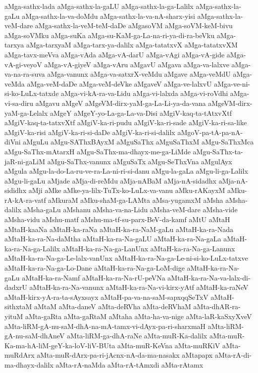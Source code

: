 {aMga-sathx-lada
aMga-sathx-la-gaLU
aMga-sathx-la-ga-Lalilx
aMga-sathx-la-gaLu
aMga-sathx-la-va-doMdu
aMga-sathx-la-va-nA-sharx-yisi
aMga-sathx-la-veM-dare
aMga-sathx-la-veM-teM-daDe
aMgasoVM
aMga-soVM-keM-bivu
aMga-soVMku
aMga-suKa
aMga-su-KaM-ga-La-na-ri-ya-di-ra-beVku
aMga-tarxya
aMga-tarxyaM
aMga-tarx-ya-dalilx
aMga-tatatxvX
aMga-tatatxvXM
aMga-tavx-meVva
aMga-vAda
aMga-vA-darU
aMga-vAgi
aMga-vA-gide
aMga-vA-gi-veyoV
aMga-vA-giyeV
aMga-vAru
aMgavU
aMgava
aMga-va-lalxve
aMga-va-na-ra-suva
aMga-vanunx
aMga-va-satxrX-veMdu
aMgave
aMga-veMdU
aMga-veMda
aMga-veM-daDe
aMga-veM-deVke
aMgaveV
aMga-ve-lalxvU
aMga-ve-ni-si-ko-LuLx-tatxde
aMga-vi-kA-ra-va-Lidu
aMga-vi-lalxda
aMga-vi-roVdhi
aMga-vi-sa-diru
aMgavu
aMgeV
aMgeVM-dirx-yaM-ga-La-Li-ya-da-vana
aMgeVM-dirx-yaM-ga-Lelalx
aMgeY
aMgeY-yo-La-ga-La-va-Disi
aMgiV-kaq-ta-tAtxvXtf
aMgiV-kaq-ta-tatxvXtf
aMgiV-ka-ri-pudu
aMgiV-ka-ri-sade
aMgiV-ka-ri-sa-like
aMgiV-ka-risi
aMgiV-ka-ri-si-daDe
aMgiV-ka-ri-si-dalilx
aMgoV-pa-tA-pa-nA-diVni
aMguLu
aMgu-SAThxBAyxM
aMguSaThx
aMguSaThxM
aMgu-SaThxMca
aMgu-SaThx-mAtarxH
aMgu-SaThx-ma-dhayx-me-ga-LiMde
aMgu-SaThx-ta-jaR-ni-gaLiM
aMgu-SaThx-vanunx
aMguSaTx
aMgu-SeThxVna
aMgulAyx
aMgula
aMgu-la-do-La-ru-ve-ra-La-ni-ri-si-danu
aMgu-la-gaLa
aMgu-li-ga-Lalilx
aMgu-li-gaLu
aMjade
aMja-di-reMdu
aMja-nABaM
aMja-nA-sidadhx
aMja-nA-sididhx
aMji
aMke
aMke-ya-lilx-TuTx-ko-LuLx-va-vanu
aMku-rAKayxM
aMku-rA-kA-ra-vatf
aMkuraM
aMku-shaM-ga-LAMta
aMsa-yugamxM
aMsha
aMsha-dalilx
aMsha-gaLu
aMshanu
aMsha-va-na-Lidu
aMsha-veM-dare
aMsha-vide
aMsha-vidu
aMshu-matf
aMshu-ma-tf-su-parx-BeV-da-kamf
aMtU
aMtaH
aMtaH-kaaNa
aMtaH-ka-raNa
aMtaH-ka-ra-NaM-gaLu
aMtaH-ka-ra-Nada
aMtaH-ka-ra-Na-daMtha
aMtaH-ka-ra-Na-gaLU
aMtaH-ka-ra-Na-gaLa
aMtaH-ka-ra-Na-ga-Lalilx
aMtaH-ka-ra-Na-ga-LanUnx
aMtaH-ka-ra-Na-ga-Lanunx
aMtaH-ka-ra-Na-ga-Le-lalx-vanUnx
aMtaH-ka-ra-Na-ga-Le-ni-si-ko-LuLx-tatxve
aMtaH-ka-ra-Na-ga-Lo-Dane
aMtaH-ka-ra-Na-ga-LoM-dige
aMtaH-ka-ra-Na-gaLu
aMtaH-ka-ra-Namf
aMtaH-ka-ra-Na-rU-peVNa
aMtaH-ka-ra-Na-va-lalx-di-dadxrU
aMtaH-ka-ra-Na-vanunx
aMtaH-ka-ra-Na-vi-kirx-yAtf
aMtaH-ka-raNeV
aMtaH-kirx-yA-ra-ta-sAyxsayx
aMtaH-pa-va-na-saM-sapxqqSeTxV
aMtaH-sithxtaM
aMtaM
aMta-daneV
aMta-deRVha
aMta-deRVhaM
aMta-dhAR-ra-yituM
aMta-gaRta
aMta-gaRtaM
aMtaha
aMta-ha-va-nige
aMta-laR-kaSxyXveV
aMta-liRM-gA-nu-saM-dhA-na-mA-tamx-vi-dAyx-pa-ri-sharxmaH
aMta-liRM-gA-nu-saM-dhAneV
aMta-liRM-ga-dhA-raNe
aMta-muR-Ka-dalilx
aMta-muR-Ka-ma-hA-liM-geY-ka-loV-liV-BUta
aMta-muR-KeVna
aMta-muRKiV
aMta-muRdArx
aMta-muR-dArx-pa-ri-jAcnx-nA-da-ma-nasakx
aMtapapx
aMta-rA-di-ma-dhayx-dalilx
aMta-rA-naMda
aMta-rA-tAmxdi
aMta-rAtamx
}
